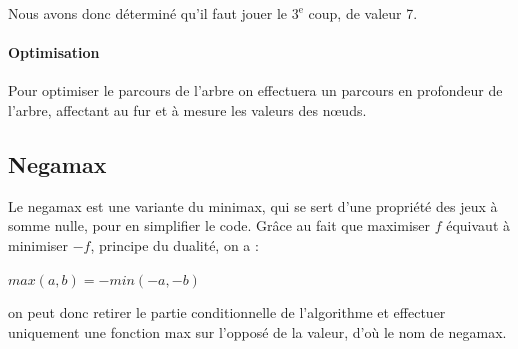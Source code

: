 			Nous avons donc déterminé qu'il faut jouer le $3^{\text{e}}$ coup, de valeur 7.

		\paragraph{Optimisation} Pour optimiser le parcours de l'arbre on effectuera un parcours
		en profondeur de l'arbre, affectant au fur et à mesure les valeurs des n\oe{}uds.

	\subsection{Negamax}
		Le negamax est une variante du minimax, qui se sert d'une propriété des jeux à
		somme nulle, pour en simplifier le code. Grâce au fait que maximiser $f$ équivaut à
		minimiser $-f$, principe du dualité, on a :

		\vspace{0.50em}
		\centerline{$max(a, b) = -min(-a, -b)$}
		\vspace{0.50em}

		\noindent
		on peut donc retirer le partie conditionnelle de l'algorithme et
		effectuer uniquement une fonction max sur l'opposé de la valeur,
		d'où le nom de negamax.


%
%
%
%
%
